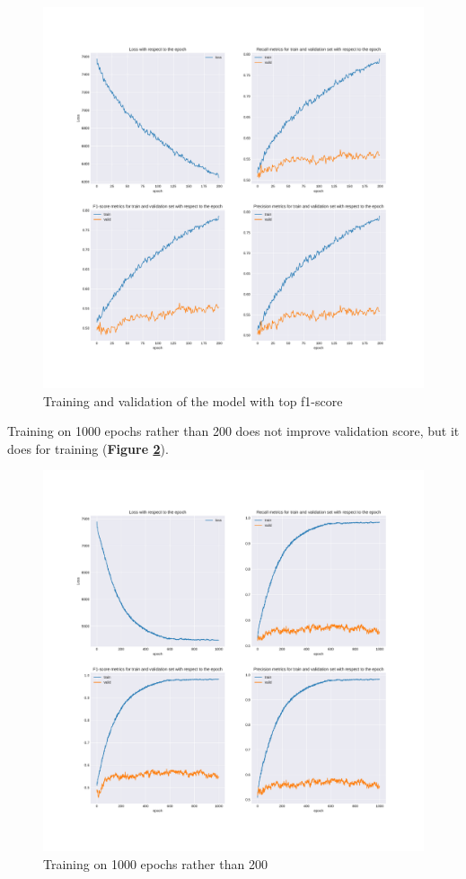 \begin{figure}
 \centering
 \includegraphics[width=\textwidth]{images/chapitre4/attention-f1}
 \caption{Training and validation of the model with top f1-score}
 \label{fig:chap4:att3:f1}
\end{figure}
Training on 1000 epochs rather than 200 does not improve validation score, but it does for training (\textbf{Figure \ref{fig:chap4:att3:f1.1}}). \\
\begin{figure}
 \centering
 \includegraphics[width=\textwidth]{images/chapitre4/attention3}
 \caption{Training on 1000 epochs rather than 200}
 \label{fig:chap4:att3:f1.1}
\end{figure}
